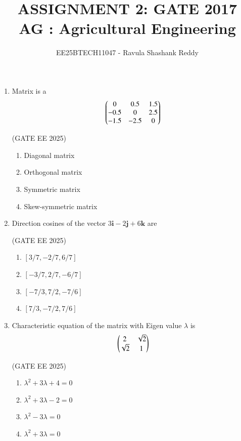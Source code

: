 \documentclass[journal,12pt,onecolumn]{IEEEtran}
\theoremstyle{remark}
\begin{document}
\title{
ASSIGNMENT 2: GATE 2017 \\
AG : Agricultural Engineering}
\author{EE25BTECH11047 - Ravula Shashank Reddy}
\maketitle
\renewcommand{\thefigure}{\theenumi}
\renewcommand{\thetable}{\theenumi}

\begin{enumerate}

\item Matrix is a
\[
\begin{pmatrix}0 & 0.5 & 1.5 \\
-0.5 & 0 & 2.5 \\
-1.5 & -2.5 & 0\end{pmatrix}
\]

\hfill(GATE EE 2025)


\begin{multicols}{2}
\begin{enumerate}
\item Diagonal matrix
\item Orthogonal matrix
\item Symmetric matrix
\item Skew-symmetric matrix
\end{enumerate}
\end{multicols}

\item Direction cosines of the vector $3\mathbf{i} - 2\mathbf{j} + 6\mathbf{k}$ are

\hfill(GATE EE 2025)

\begin{multicols}{4}
\begin{enumerate}
\item $[3/7, -2/7, 6/7]$
\item $[-3/7, 2/7, -6/7]$
\item $[-7/3, 7/2, -7/6]$
\item $[7/3, -7/2, 7/6]$
\end{enumerate}
\end{multicols}

\item Characteristic equation of the matrix with Eigen value $\lambda$ is
\[
\begin{pmatrix}2 & \sqrt{2} \\
\sqrt{2} & 1\end{pmatrix}
\]

\hfill(GATE EE 2025)

\begin{multicols}{4}
\begin{enumerate}
\item $\lambda^2 + 3\lambda + 4 = 0$
\item $\lambda^2 + 3\lambda - 2 = 0$
\item $\lambda^2 - 3\lambda = 0$
\item $\lambda^2 + 3\lambda = 0$
\end{enumerate}
\end{multicols}


\end{enumerate}
\end{document}
